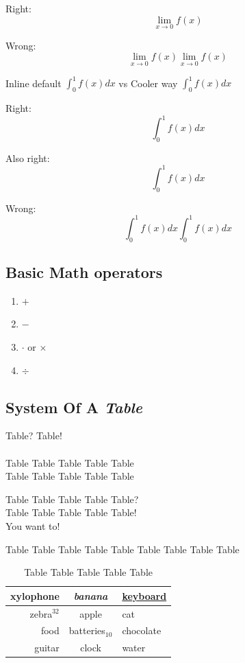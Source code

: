 \documentclass[a4paper,12pt]{article}
\begin{document}
Right:
\begin{equation}
    \lim_{x \rightarrow 0} f(x)
\end{equation}

Wrong:
$$\lim_{x \rightarrow 0} f(x)

\lim_{x \rightarrow 0} f(x)
$$

\vspace{2cm}

Inline default $\int_0^1 f(x) dx$ vs Cooler way $\displaystyle \int_0^1 f(x) dx$

Right:
$$\int_0^1f(x)dx$$

Also right:
\begin{equation}
    \int_0^1 f(x) dx
\end{equation}

Wrong:
\begin{equation}
    \int_0^1 f(x) dx

    \int_0^1 f(x) dx
\end{equation}

\subsection{Basic Math operators}
\begin{enumerate}
    \item $+$
    \item $-$
    \item $\cdot$ or $\times$
    \item $\div$
\end{enumerate}

\subsection{System Of A \textit{Table}}
Table? Table! \\ \\
Table Table Table Table Table \\
Table Table Table Table Table

Table Table Table Table Table? \\
Table Table Table Table Table! \\
You want to!

Table Table Table Table Table Table Table Table Table

\begin{table}[ht]
    \centering
    \begin{tabular}{r|c|l}
        \hline
        \textbf{xylophone} & \textit{banana} & \underline{keyboard} \\
        \hline
        zebra$^{32}$ & apple & cat \\
        \hline
        food & batteries$_{10}$ & chocolate \\
        guitar & clock & water
    \end{tabular}
    \caption{Table Table Table Table Table}
    \label{tab:table}
\end{table}
\end{document}
